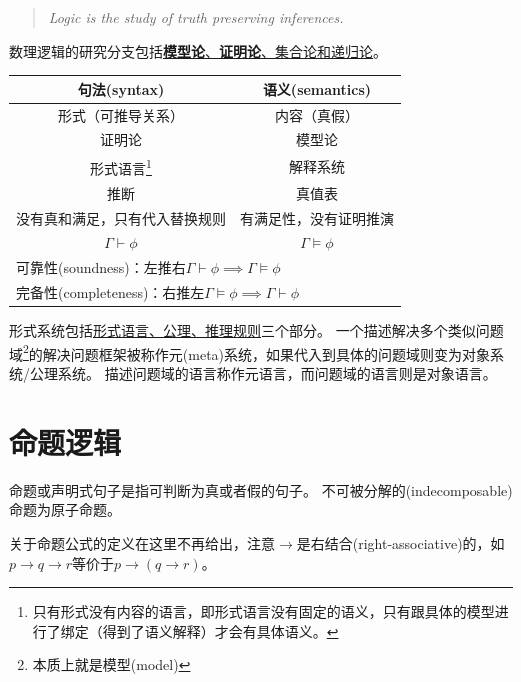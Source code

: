 
\begin{quote}
\emph{Logic is the study of truth preserving inferences.}
\end{quote}

\bigskip
数理逻辑的研究分支包括\underline{\textbf{模型论}、\textbf{证明论}、集合论和递归论}。
\begin{center}
\begin{tabular}{|c|c|}\hline
\textbf{句法(syntax)} & \textbf{语义(semantics)}\\\hline
形式（可推导关系） & 内容（真假）\\\hline
证明论 & 模型论\\\hline
形式语言\footnote{只有形式没有内容的语言，即形式语言没有固定的语义，只有跟具体的模型进行了绑定（得到了语义解释）才会有具体语义。} & 解释系统\\\hline
推断 & 真值表\\\hline
没有真和满足，只有代入替换规则 & 有满足性，没有证明推演\\\hline
$\Gamma\vdash\phi$ & $\Gamma\models\phi$\\\hline
\multicolumn{2}{|l|}{可靠性(soundness)：左推右$\Gamma\vdash\phi\implies\Gamma\models\phi$}\\\hline
\multicolumn{2}{|l|}{完备性(completeness)：右推左$\Gamma\models\phi\implies\Gamma\vdash\phi$}\\\hline
\end{tabular}
\end{center}

形式系统包括\underline{形式语言、公理、推理规则}三个部分。
一个描述解决多个类似问题域\footnote{本质上就是模型(model)}的解决问题框架被称作元(meta)系统，如果代入到具体的问题域则变为对象系统/公理系统。
描述问题域的语言称作元语言，而问题域的语言则是对象语言。

\section{命题逻辑}
\begin{definition}[命题(proposition)]
命题或声明式句子是指可判断为真或者假的句子。
不可被分解的(indecomposable)命题为原子命题。
\end{definition}

关于命题公式的定义在这里不再给出，注意$\to$是右结合(right-associative)的，如$p\to q\to r$等价于$p\to(q\to r)$。

